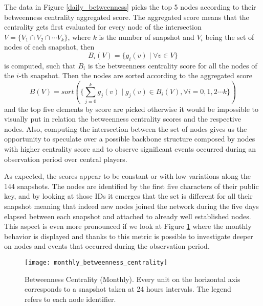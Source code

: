 	The data in Figure \ref{daily_betweenness} picks the top 5 nodes according to their betweenness centrality aggregated score. The aggregated score means that the centrality gets first evaluated for every node of the intersection $V = \{V_1 \cap V_2 \cap \cdots V_k \}$, where $k$ is the number of snapshot and $V_i$ being the set of nodes of each snapshot, then
	\begin{equation}\label{eq:betwenness}
		B_i(V) = \{ g_i(v) \mid \forall v \in V \}
	\end{equation}
	is computed, such that $B_i$ is the betweenness centrality score for all the nodes of the $i$-th snapshot. Then the nodes are sorted according to the aggregated score
	\begin{equation}
		B(V) = sort(\{ \sum_{j = 0}^{k}g_j(v) \mid g_j(v) \in B_i(V), \forall i= 0,1,2 \cdots k\})
	\end{equation}
	and the top five elements by score are picked otherwise it would be impossible to visually put in relation the betweenness centrality scores and the respective nodes. Also, computing the intersection between the set of nodes gives us the opportunity to speculate over a possible backbone structure composed by nodes with higher centrality score and to observe significant events occurred during an observation period over central players.
	
	As expected, the scores appear to be constant or with low variations along the 144 snapshots. The nodes are identified by the first five characters of their public key, and by looking at those IDs it emerges that the set is different for all their snapshot meaning that indeed new nodes joined the network during the five days elapsed between each snapshot and attached to already well established nodes. This aspect is even more pronounced if we look at Figure \ref{monthly_betweenness_centrality} where the monthly behavior is displayed and thanks to this metric is possible to investigate deeper on nodes and events that occurred during the observation period. 
	
	\begin{figure}[ht!]
		\centering
		\texttt{[image: monthly\_betweenness\_centrality]}
		\caption{Betweenness Centrality (Monthly). Every unit on the horizontal axis corresponds to a snapshot taken at 24 hours intervals. The legend refers to each node identifier.}
		\label{monthly_betweenness_centrality}
	\end{figure}		
	
